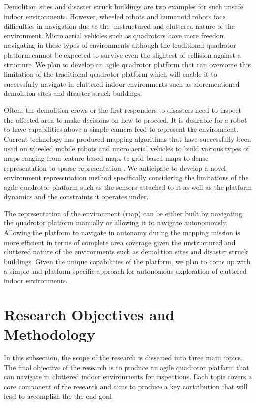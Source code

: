 \documentclass[12pt,a4paper]{report}
\begin{document}
Demolition sites and disaster struck buildings are two examples for such unsafe indoor environments. However, wheeled robots and humanoid robots face difficulties in navigation due to the unstructured and cluttered nature of the environment. Micro aerial vehicles such as quadrotors have more freedom navigating in these types of environments although the traditional quadrotor platform cannot be expected to survive even the slightest of collision against a structure. We plan to develop an agile quadrotor platform that can overcome this limitation of the traditional quadrotor platform which will enable it to successfully navigate in cluttered indoor environments such as aforementioned demolition sites and disaster struck buildings. \par 

Often, the demolition crews or the first responders to disasters need to inspect the affected area to make decisions on how to proceed. It is desirable for a robot to have capabilities above a simple camera feed to represent the environment. Current technology has produced mapping algorithms that have successfully been used on wheeled mobile robots and micro aerial vehicles to build various types of maps ranging from feature based maps to grid based maps to dense representation to sparse representation \cite{WURM2010140,grzonka2012fully,Cadena2016,g2oKummerle2011,ila2010,doi:10.1177/0278364914523689}. We anticipate to develop a novel environment representation method  specifically considering the limitations of the agile quadrotor platform such as the sensors attached to it as well as the platform dynamics and the constraints it operates under. \par 

The representation of the environment (map) can be either built by navigating the quadrotor platform manually or allowing it to navigate autonomously. Allowing the platform to navigate in autonomy during the mapping mission is more efficient in terms of complete area coverage given the unstructured and cluttered nature of the environments such as demolition sites and disaster struck buildings. Given the unique capabilities of the platform, we plan to come up with a simple and platform specific approach for autonomous exploration of cluttered indoor environments.

\section{Research Objectives and Methodology}
\label{researchObjectives}
In this subsection, the scope of the research is dissected into three main topics. The final objective of the research is to produce an agile quadrotor platform that can navigate in cluttered indoor environments for inspections. Each topic covers a core component of the research and aims to produce a key contribution that will lead to accomplish the the end goal. \par
\end{document}
